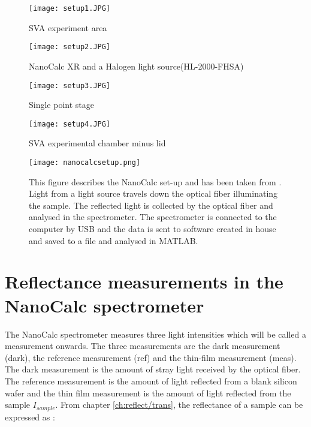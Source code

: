 \documentclass[MasterThesisMain.tex]{subfiles}
\begin{document}
	\begin{figure}[ht] 
	  \begin{minipage}[b]{0.5\linewidth}
	    \centering
	    \texttt{[image: setup1.JPG]} 
	    \caption{SVA experiment area}
	    \label{fig:exparea}  
	    \vspace{4ex}
	  \end{minipage}%
	  \begin{minipage}[b]{0.5\linewidth}
	    \centering
	    \texttt{[image: setup2.JPG]} 
	    \caption{NanoCalc XR and a Halogen light source(HL-2000-FHSA)}
	    \label{fig:speclight} 
	    \vspace{4ex}
	  \end{minipage} 
	  \begin{minipage}[b]{0.5\linewidth}
	    \centering
	    \texttt{[image: setup3.JPG]} 
	    \caption{Single point stage} 
	    \label{fig:Singlestage}
	    \vspace{4ex}
	  \end{minipage}%
	  \begin{minipage}[b]{0.5\linewidth}
	    \centering
	    \texttt{[image: setup4.JPG]} 
	    \caption{SVA experimental chamber \break minus lid}
	    \label{fig:SVAchamber} 
	    \vspace{4ex}
	  \end{minipage} 
	\end{figure}
	
	\begin{figure}
	\centering
		\texttt{[image: nanocalcsetup.png]}
		\caption{This figure describes the NanoCalc set-up and has been taken from \cite{nanocalcmanual}. Light from a light source travels down the optical fiber illuminating the sample. The reflected light is collected by the optical fiber and analysed in the spectrometer. The spectrometer is connected to the computer by USB and the data is sent to software created in house and saved to a file and analysed in MATLAB\textsuperscript{\textregistered}.}
		\label{fig:nanocalcsetup}
	\end{figure}
	
\section{Reflectance measurements in the NanoCalc spectrometer}
The NanoCalc spectrometer measures three light intensities which will be called a measurement onwards. The three measurements are the dark measurement (dark), the reference measurement (ref) and the thin-film measurement (meas). The dark measurement is the amount of stray light received by the optical fiber. The reference measurement is the amount of light reflected from a blank silicon wafer and the thin film measurement is the amount of light reflected from the sample $I_{sample}$. From chapter \ref{ch:reflect/trans}, the reflectance of a sample can be expressed as :
\end{document}
